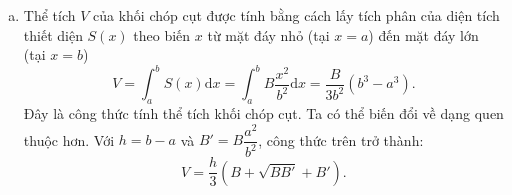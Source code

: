 \begin{bt}
{\begin{enumerate}[a)]
			$$ \frac{S(x)}{B} = \left(\frac{\text{ chiều cao chóp nhỏ}}{\text{ chiều cao chóp lớn}}\right)^2 = \left(\frac{x}{b}\right)^2  = \frac{x^2}{b^2}. $$
			$$ \Rightarrow S(x) = B \cdot \frac{x^2}{b^2} \quad  (\text{đpcm}). $$
			\item Thể tích $V$ của khối chóp cụt được tính bằng cách lấy tích phân của diện tích thiết diện $S(x)$ theo biến $x$ từ mặt đáy nhỏ  (tại $x=a$) đến mặt đáy lớn (tại $x=b$)
			 $$ V = \int_{a}^{b} S(x)\mathrm{d}x = \int_{a}^{b} B \frac{x^2}{b^2} \mathrm{d}x = \frac{B}{3b^2} (b^3 - a^3) .$$
			Đây là công thức tính thể tích khối chóp  cụt. Ta có thể biến đổi về dạng quen thuộc hơn.
			Với $h=b-a$ và $B' = B\dfrac{a^2}{b^2}$, công  thức trên trở thành:
			$$ V = \frac{h}{3}(B  + \sqrt{BB'} + B') .$$
		\end{enumerate}
	 }
\end{bt}

